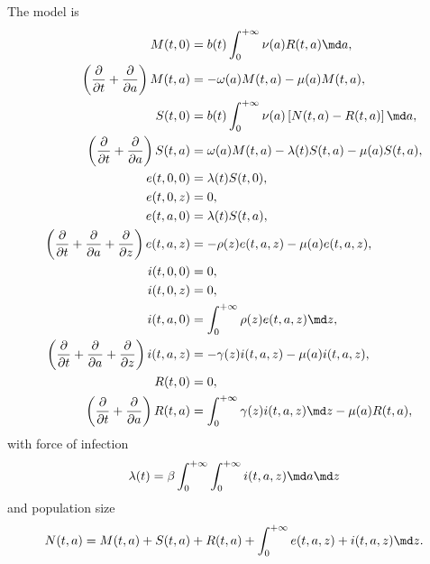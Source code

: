 \documentclass{jpmarticle}
\begin{document}
The model is
\begin{equation}
  \label{model_age_and_time_since_entry_structured}
  \begin{split}
    M(t, 0) &=
    b(t) \int_0^{+\infty} \nu(a) R(t, a) \md a,
    \\
    \left(\frac{\partial}{\partial t}
      + \frac{\partial}{\partial a}\right)
    M(t, a) &=
    - \omega(a) M(t, a) - \mu(a) M(t, a),
    \\
    S(t, 0) &=
    b(t) \int_0^{+\infty} \nu(a) \left[N(t, a) - R(t, a)\right] \md a,
    \\
    \left(\frac{\partial}{\partial t}
      + \frac{\partial}{\partial a}\right)
    S(t, a) &=
    \omega(a) M(t, a) - \lambda(t) S(t, a) - \mu(a) S(t, a),
    \\
    e(t, 0, 0) &=
    \lambda(t) S(t, 0),
    \\
    e(t, 0, z) &=
    0,
    \\
    e(t, a, 0) &=
    \lambda(t) S(t, a),
    \\
    \left(\frac{\partial}{\partial t}
      + \frac{\partial}{\partial a}
      + \frac{\partial}{\partial z}\right)
    e(t, a, z) &=
    - \rho(z) e(t, a, z) - \mu(a) e(t, a, z),
    \\
    i(t, 0, 0) &=
    0,
    \\
    i(t, 0, z) &=
    0,
    \\
    i(t, a, 0) &=
    \int_0^{+\infty} \rho(z) e(t, a, z) \md z,
    \\
    \left(\frac{\partial}{\partial t}
      + \frac{\partial}{\partial a}
      + \frac{\partial}{\partial z}\right)
    i(t, a, z) &=
    - \gamma(z) i(t, a, z) - \mu(a) i(t, a, z),
    \\
    R(t, 0) &=
    0,
    \\
    \left(\frac{\partial}{\partial t}
      + \frac{\partial}{\partial a}\right)
    R(t, a) &=
    \int_0^{+\infty} \gamma(z) i(t, a, z) \md z
    - \mu(a) R(t, a),
  \end{split}
\end{equation}
with force of infection
\begin{equation}
  \lambda(t) =
  \beta
  \int_0^{+\infty} \int_0^{+\infty}
  i(t, a, z)
  \md a \md z
\end{equation}
and population size
\begin{equation}
  N(t, a) =
  M(t, a) + S(t, a) + R(t, a)
  + \int_0^{+\infty} e(t, a, z) + i(t, a, z) \md z.
\end{equation}
\end{document}
